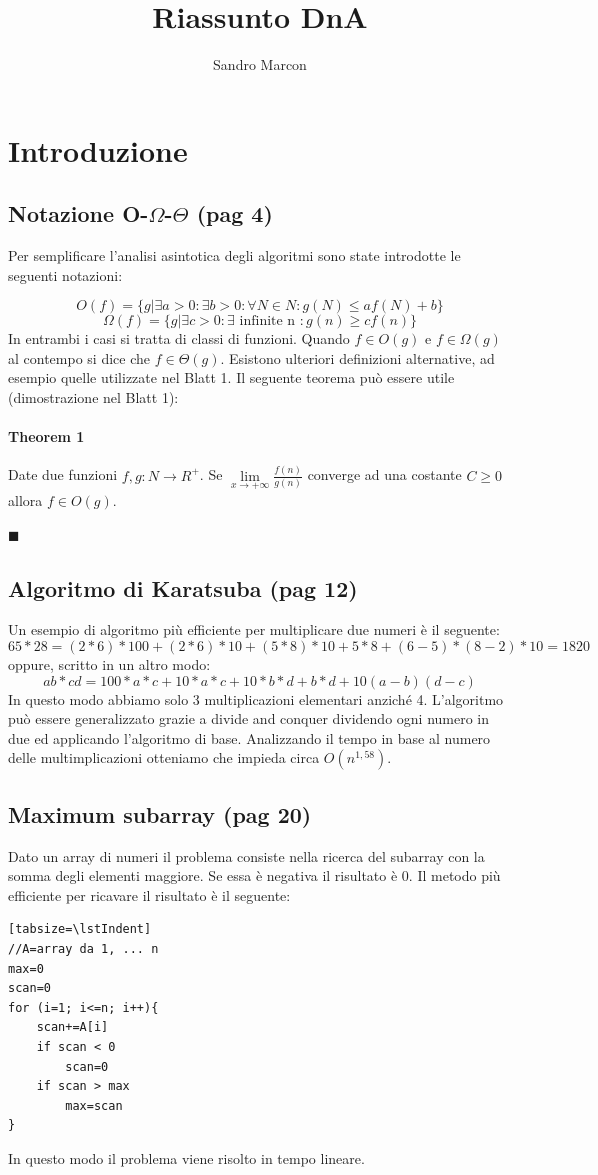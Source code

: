\documentclass[a4paper]{book}
\author{Sandro Marcon}
\title{Riassunto DnA}
\newenvironment{mytheorem}[1]{\subsubsection*{Theorem #1}}{\begin{flushright}$\blacksquare$\end{flushright}}
\newcommand{\lstIndent}{4}
\begin{document}
\tableofcontents
\chapter{Introduzione}
\section{Notazione O-$\Omega$-$\Theta$ (pag 4)}
Per semplificare l'analisi asintotica degli algoritmi sono state introdotte le 
seguenti notazioni:

$$O(f)=\{ g|\exists a>0: \exists b>0: \forall N \in N : g(N)\leq af(N)+b \}$$
$$\Omega (f)=\{ g|\exists c>0: \exists \mbox{ infinite n } : g(n) \geq cf(n) \}$$
In entrambi i casi si tratta di classi di funzioni. Quando $f \in O(g)$ e $f \in \Omega (g)$ al contempo si dice che $f \in \Theta (g)$. Esistono ulteriori definizioni alternative, ad esempio quelle utilizzate nel Blatt 1. Il seguente teorema può essere utile (dimostrazione nel Blatt 1):
\newtheorem{theorem}{Theorem}
\begin{mytheorem}{1}
Date due funzioni $ f,g: N \rightarrow R^{+} $. Se $ \lim\limits_{x \rightarrow +\infty} \frac{f(n)}{g(n)} $ converge ad una costante $C\geq 0$ allora $f \in O(g)$.
\end{mytheorem}
\section{Algoritmo di Karatsuba (pag 12)}
Un esempio di algoritmo più efficiente per multiplicare due numeri è il seguente:
$$65 * 28 = (2 * 6) * 100 + (2 * 6) * 10 + (5 * 8) * 10 + 5 * 8 + (6-5)*(8-2) * 10 = 1820 $$
oppure, scritto in un altro modo:
\[ab*cd=100*a*c+10*a*c+10*b*d+b*d+10(a-b)(d-c)\]
In questo modo abbiamo solo 3 multiplicazioni elementari anziché 4. L'algoritmo può essere generalizzato grazie a divide and conquer dividendo ogni numero in due ed applicando l'algoritmo di base. Analizzando il tempo in base al numero delle multimplicazioni otteniamo che impieda circa $O(n^{1,58})$.
\section{Maximum subarray (pag 20)}
Dato un array di numeri il problema consiste nella ricerca del subarray con la somma degli elementi maggiore. Se essa è negativa il risultato è 0. Il metodo più efficiente per ricavare il risultato è il seguente:
\begin{lstlisting}[tabsize=\lstIndent][tabsize=\lstIndent]
//A=array da 1, ... n	
max=0	
scan=0
for (i=1; i<=n; i++){	
	scan+=A[i]
	if scan < 0
		scan=0
	if scan > max 
		max=scan
}			
\end{lstlisting}
In questo modo il problema viene risolto in tempo lineare.	
\end{document}
